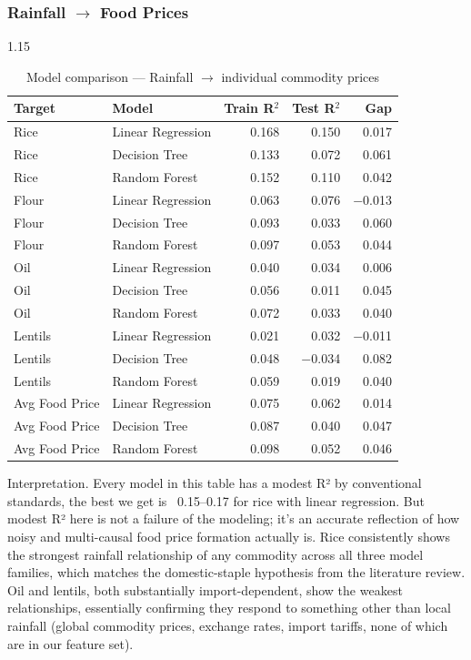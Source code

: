 \documentclass[12pt,a4paper]{article}
\begin{document}
\subsubsection{Rainfall $\rightarrow$ Food Prices}
\begin{table}[H]
\centering
\begin{spacing}{1.15}
\caption{Model comparison --- Rainfall $\rightarrow$ individual commodity prices}
\label{tab:model1}
\begin{tabular}{llrrr}
\toprule
\textbf{Target} & \textbf{Model} & \textbf{Train R$^2$} & \textbf{Test R$^2$} & \textbf{Gap} \\
\midrule
Rice           & Linear Regression & 0.168 &  0.150 &  0.017 \\
Rice           & Decision Tree     & 0.133 &  0.072 &  0.061 \\
Rice           & Random Forest     & 0.152 &  0.110 &  0.042 \\
\midrule
Flour          & Linear Regression & 0.063 &  0.076 & $-$0.013 \\
Flour          & Decision Tree     & 0.093 &  0.033 &  0.060 \\
Flour          & Random Forest     & 0.097 &  0.053 &  0.044 \\
\midrule
Oil            & Linear Regression & 0.040 &  0.034 &  0.006 \\
Oil            & Decision Tree     & 0.056 &  0.011 &  0.045 \\
Oil            & Random Forest     & 0.072 &  0.033 &  0.040 \\
\midrule
Lentils        & Linear Regression & 0.021 &  0.032 & $-$0.011 \\
Lentils        & Decision Tree     & 0.048 & $-$0.034 & 0.082 \\
Lentils        & Random Forest     & 0.059 &  0.019 &  0.040 \\
\midrule
Avg Food Price & Linear Regression & 0.075 &  0.062 &  0.014 \\
Avg Food Price & Decision Tree     & 0.087 &  0.040 &  0.047 \\
Avg Food Price & Random Forest     & 0.098 &  0.052 &  0.046 \\
\bottomrule
\end{tabular}
\end{spacing}
\end{table}
Interpretation. Every model in this table has a modest R² by conventional standards, the best we get is ~0.15--0.17 for rice with linear regression. But modest R² here is not a failure of the modeling; it's an accurate reflection of how noisy and multi-causal food price formation actually is. Rice consistently shows the strongest rainfall relationship of any commodity across all three model families, which matches the domestic-staple hypothesis from the literature review. Oil and lentils, both substantially import-dependent, show the weakest relationships, essentially confirming they respond to something other than local rainfall (global commodity prices, exchange rates, import tariffs, none of which are in our feature set).
\end{document}
